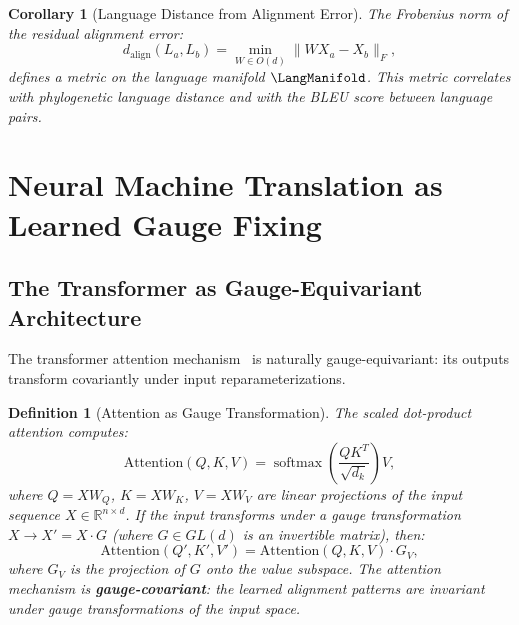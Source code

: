 \documentclass[12pt,a4paper]{article}
\newtheorem{corollary}[theorem]{Corollary}
\newtheorem{definition}[theorem]{Definition}
\theoremstyle{remark}
\newcommand{\R}{\mathbb{R}}
\DeclareMathOperator{\softmax}{softmax}
\begin{document}
\begin{corollary}[Language Distance from Alignment Error]
\label{cor:align_distance}
The Frobenius norm of the residual alignment error:
\begin{equation}
  d_{\text{align}}(L_a, L_b) = \min_{W \in O(d)} \|W X_a - X_b\|_F,
\end{equation}
defines a metric on the language manifold $\LangManifold$. This metric
correlates with phylogenetic language distance and with the BLEU score
between language pairs.
\end{corollary}


\section{Neural Machine Translation as Learned Gauge Fixing}
\label{sec:nmt_gauge}

\subsection{The Transformer as Gauge-Equivariant Architecture}

The transformer attention mechanism~\cite{vaswani2017attention} is
naturally gauge-equivariant: its outputs transform covariantly under
input reparameterizations.

\begin{definition}[Attention as Gauge Transformation]
\label{def:attention_gauge}
The scaled dot-product attention computes:
\begin{equation}
  \text{Attention}(Q, K, V) = \softmax\left(\frac{QK^T}{\sqrt{d_k}}\right) V,
\end{equation}
where $Q = X W_Q$, $K = X W_K$, $V = X W_V$ are linear projections
of the input sequence $X \in \R^{n \times d}$. If the input transforms
under a gauge transformation $X \to X' = X \cdot G$ (where $G \in GL(d)$
is an invertible matrix), then:
\begin{equation}
  \text{Attention}(Q', K', V') = \text{Attention}(Q, K, V) \cdot G_V,
\end{equation}
where $G_V$ is the projection of $G$ onto the value subspace. The
attention mechanism is \textbf{gauge-covariant}: the learned alignment
patterns are invariant under gauge transformations of the input space.
\end{definition}
\end{document}
